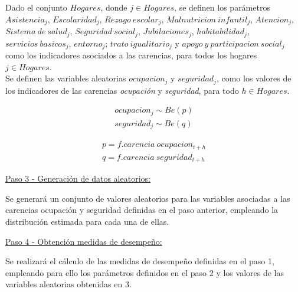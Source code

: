 \documentclass[12pt,letterpaper,spanish]{article}
\begin{document}
\begin{enumerate}
        Dado el conjunto $Hogares$, donde $j \in Hogares$, se definen los parámetros $Asistencia_j$, $Escolaridad_j$, $Rezago\:escolar_j$, $Malnutricion \:infantil_j$, $Atencion_j$, $Sistema \: de \:salud_j$, $Seguridad\:social_j$, $Jubilaciones_j$, $habitabilidad_j$, $servicios\:basicos_j$, $entorno_j$; $trato\:igualitario_j$ y $apoyo\:y\:participacion\:social_j$ como los indicadores asociados a las carencias, para todos los hogares $j\in Hogares$.\\ 
        
        Se definen las variables aleatorias $ocupacion_j$ y $seguridad_j$, como los valores de los indicadores de las carencias \textit{ocupación} y \textit{seguridad}, para todo $h\in Hogares$.
        
        
        \begin{equation} \label{bernoulli}
        \begin{split}
        ocupacion_j\sim Be(p)\\
        seguridad_j\sim Be(q)
        \end{split}
        \end{equation}
        
        \begin{equation} \label{bernoulli}
        \begin{split}
        p=  f.carencia\:ocupacion_{t+h}\\
        q=  f.carencia\:seguridad_{t+h}
        \end{split}
        \end{equation}


\vspace{2em}        

\underline{Paso 3 - Generación de datos aleatorios:} 

Se generará un conjunto de valores aleatorios para las variables asociadas a las carencias ocupación y seguridad definidas en el paso anterior, empleando la distribución estimada para cada una de ellas. 


\vspace{2em}

\underline{Paso 4 - Obtención medidas de desempeño:} 

Se realizará el cálculo de las medidas de desempeño definidas en el paso 1, empleando para ello los parámetros definidos en el paso 2 y los valores de las variables aleatorias obtenidas en 3. 


\vspace{2em}


\end{enumerate}
\end{document}
